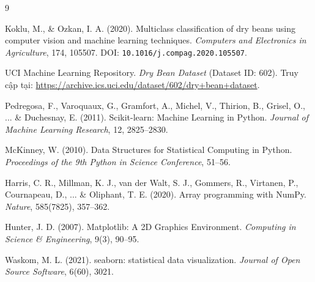 \documentclass[a4paper,12pt]{report}
\begin{document}
\renewcommand{\bibname}{Tài liệu tham khảo}
\begin{thebibliography}{9}

Koklu, M., \& Ozkan, I. A. (2020). Multiclass classification of dry beans using computer vision and machine learning techniques. \textit{Computers and Electronics in Agriculture}, 174, 105507. DOI: \texttt{10.1016/j.compag.2020.105507}.

UCI Machine Learning Repository. \textit{Dry Bean Dataset} (Dataset ID: 602). Truy cập tại: \url{https://archive.ics.uci.edu/dataset/602/dry+bean+dataset}.

Pedregosa, F., Varoquaux, G., Gramfort, A., Michel, V., Thirion, B., Grisel, O., ... \& Duchesnay, E. (2011). Scikit-learn: Machine Learning in Python. \textit{Journal of Machine Learning Research}, 12, 2825--2830.

McKinney, W. (2010). Data Structures for Statistical Computing in Python. \textit{Proceedings of the 9th Python in Science Conference}, 51--56.

Harris, C. R., Millman, K. J., van der Walt, S. J., Gommers, R., Virtanen, P., Cournapeau, D., ... \& Oliphant, T. E. (2020). Array programming with NumPy. \textit{Nature}, 585(7825), 357--362.

Hunter, J. D. (2007). Matplotlib: A 2D Graphics Environment. \textit{Computing in Science \& Engineering}, 9(3), 90--95.

Waskom, M. L. (2021). seaborn: statistical data visualization. \textit{Journal of Open Source Software}, 6(60), 3021.

\end{thebibliography}
\end{document}
